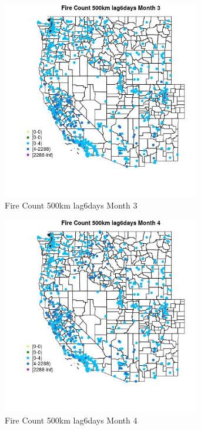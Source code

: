 \begin{figure} 
\centering  
\includegraphics[width=0.77\textwidth]{Code_Outputs/Report_ML_input_PM25_Step4_part_e_de_duplicated_aves_compiled_2019-05-21wNAs_MapObsMo3Fire_Count_500km_lag6days.jpg} 
\caption{\label{fig:Report_ML_input_PM25_Step4_part_e_de_duplicated_aves_compiled_2019-05-21wNAsMapObsMo3Fire_Count_500km_lag6days}Fire Count 500km lag6days Month 3} 
\end{figure} 
 

\clearpage 

\begin{figure} 
\centering  
\includegraphics[width=0.77\textwidth]{Code_Outputs/Report_ML_input_PM25_Step4_part_e_de_duplicated_aves_compiled_2019-05-21wNAs_MapObsMo4Fire_Count_500km_lag6days.jpg} 
\caption{\label{fig:Report_ML_input_PM25_Step4_part_e_de_duplicated_aves_compiled_2019-05-21wNAsMapObsMo4Fire_Count_500km_lag6days}Fire Count 500km lag6days Month 4} 
\end{figure} 
 

